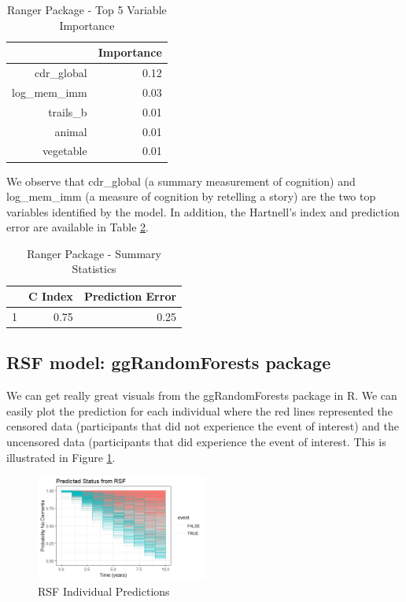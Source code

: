 \documentclass[a4paper,man,natbib,11pt]{article}
\begin{document}
\begin{table}[ht]
\centering
\caption{Ranger Package - Top 5 Variable Importance}
\begin{tabular}{rr}
  \hline
 & Importance \\ 
  \hline
cdr\_global & 0.12 \\ 
  log\_mem\_imm & 0.03 \\ 
  trails\_b & 0.01 \\ 
  animal & 0.01 \\ 
  vegetable & 0.01 \\ 
   \hline
\end{tabular}
\label{ranger_vi}
\end{table}

We observe that cdr\_global (a summary measurement of cognition) and log\_mem\_imm (a measure of cognition by retelling a story) are the two top variables identified by the model. In addition, the Hartnell's index and prediction error are available in Table \ref{ranger_stat}.

\begin{table}[ht]
\centering
\caption{Ranger Package - Summary Statistics}
\begin{tabular}{rrr}
  \hline
 & C Index & Prediction Error \\ 
  \hline
1 & 0.75 & 0.25 \\ 
   \hline
\end{tabular}
\label{ranger_stat}
\end{table}

\subsection{RSF model: ggRandomForests package}

We can get really great visuals from the ggRandomForests package in R. We can easily plot the prediction for each individual where the red lines represented the censored data (participants that did not experience the event of interest) and the uncensored data (participants that did experience the event of interest. This is illustrated in Figure \ref{fig:RSF_pred}. 

\begin{figure}[h!]%
    \centering
    \includegraphics[width=0.5\textwidth]{figures/Predicted_Individual_RSF.jpeg}
    \caption{RSF Individual Predictions}%
    \label{fig:RSF_pred}%
\end{figure}
\end{document}
